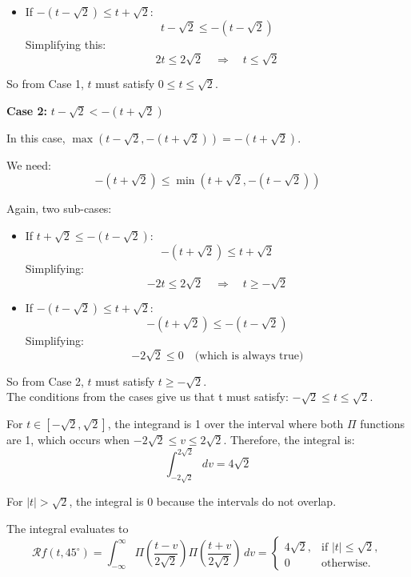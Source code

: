 \documentclass[12pt,twoside]{article}
\begin{document}
\begin{enumerate}
\begin{itemize}
    \item If \( -(t - \sqrt{2}) \leq t + \sqrt{2} \):
    \[
    t - \sqrt{2} \leq -(t - \sqrt{2})
    \]
    Simplifying this:
    \[
    2t \leq 2\sqrt{2} \quad \Rightarrow \quad t \leq \sqrt{2}
    \]
\end{itemize}

So from Case 1, \( t \) must satisfy \( 0 \leq t \leq \sqrt{2} \).

\textbf{Case 2: } \( t - \sqrt{2} < -(t + \sqrt{2}) \)

In this case, \( \max(t - \sqrt{2}, -(t + \sqrt{2})) = -(t + \sqrt{2}) \).

We need:
\[
-(t + \sqrt{2}) \leq \min(t + \sqrt{2}, -(t - \sqrt{2}))
\]

Again, two sub-cases:

\begin{itemize}
    \item If \( t + \sqrt{2} \leq -(t - \sqrt{2}) \):
    \[
    -(t + \sqrt{2}) \leq t + \sqrt{2}
    \]
    Simplifying:
    \[
    -2t \leq 2\sqrt{2} \quad \Rightarrow \quad t \geq -\sqrt{2}
    \]

    \item If \( -(t - \sqrt{2}) \leq t + \sqrt{2} \):
    \[
    -(t + \sqrt{2}) \leq -(t - \sqrt{2})
    \]
    Simplifying:
    \[
    -2\sqrt{2} \leq 0 \quad \text{(which is always true)}
    \]
\end{itemize}

So from Case 2, \( t \) must satisfy \( t \geq -\sqrt{2} \).
\[\]
The conditions from the cases give us that t must satisfy: $- \sqrt{2}  \leq  t  \leq  \sqrt{2} $.

For $t \in \left[ - \sqrt{2},  \sqrt{2} \right]$, the integrand is 1 over the interval where both $\Pi$ functions are 1, which occurs when 
$ -2 \sqrt{2}  \leq  v  \leq  2 \sqrt{2}$. Therefore, the integral is:
\[
	 \int_{-2 \sqrt{2}}^{2 \sqrt{2}} dv  = 4 \sqrt{2}
\]

For $|t| > \sqrt{2}$, the integral is 0  because the intervals do not overlap.

The integral evaluates to
\[
\mathcal{R}f(t, 45^{\circ})  =
 \int_{-\infty}^{\infty} \Pi\left(\frac{t-v}{2\sqrt{2}}\right) \Pi\left(\frac{t+v}{2\sqrt{2}}\right) \, dv  =
\begin{cases}
     4 \sqrt{2}, & \text{if } |t| \leq \sqrt{2}, \\
    0 & \text{otherwise}.
\end{cases}
\]


\end{enumerate}
\end{document}
